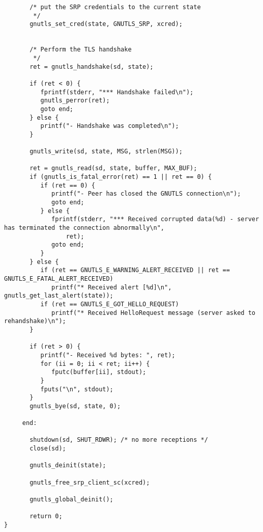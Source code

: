 \begin{verbatim}
       /* put the SRP credentials to the current state
        */
       gnutls_set_cred(state, GNUTLS_SRP, xcred);


       /* Perform the TLS handshake
        */
       ret = gnutls_handshake(sd, state);

       if (ret < 0) {
	      fprintf(stderr, "*** Handshake failed\n");
	      gnutls_perror(ret);
	      goto end;
       } else {
	      printf("- Handshake was completed\n");
       }

       gnutls_write(sd, state, MSG, strlen(MSG));

       ret = gnutls_read(sd, state, buffer, MAX_BUF);
       if (gnutls_is_fatal_error(ret) == 1 || ret == 0) {
	      if (ret == 0) {
		     printf("- Peer has closed the GNUTLS connection\n");
		     goto end;
	      } else {
		     fprintf(stderr, "*** Received corrupted data(%d) - server has terminated the connection abnormally\n",
			     ret);
		     goto end;
	      }
       } else {
	      if (ret == GNUTLS_E_WARNING_ALERT_RECEIVED || ret == GNUTLS_E_FATAL_ALERT_RECEIVED)
		     printf("* Received alert [%d]\n", gnutls_get_last_alert(state));
	      if (ret == GNUTLS_E_GOT_HELLO_REQUEST)
		     printf("* Received HelloRequest message (server asked to rehandshake)\n");
       }

       if (ret > 0) {
	      printf("- Received %d bytes: ", ret);
	      for (ii = 0; ii < ret; ii++) {
		     fputc(buffer[ii], stdout);
	      }
	      fputs("\n", stdout);
       }
       gnutls_bye(sd, state, 0);

     end:

       shutdown(sd, SHUT_RDWR);	/* no more receptions */
       close(sd);

       gnutls_deinit(state);

       gnutls_free_srp_client_sc(xcred);

       gnutls_global_deinit();

       return 0;
}

\end{verbatim}